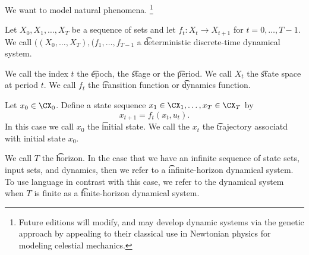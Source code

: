 

We want to model natural phenomena. \footnote{Future editions will modify, and may develop dynamic systems via the genetic approach by appealing to their classical use in Newtonian physics for modeling celestial mechanics.}


Let $X_0, X_1, \dots, X_T$ be a sequence of sets and let $f_t: X_t \to X_{t+1}$ for $t = 0, \dots, T-1$.
We call $((X_0, \dots, X_T), (f_1, \dots, f_{T-1}$ a \t{deterministic discrete-time dynamical system}.

We call the index $t$ the \t{epoch}, the \t{stage} or the \t{period}.
We call $X_t$ the \t{state space} at period $t$.
We call $f_t$ the \t{transition function} or \t{dynamics function}.

Let $x_0 \in \CX_0$.  Define a state sequence $x_1 \in \CX_1, \dots, x_T \in \CX_T$ by
\[
    x_{t+1} = f_t(x_t, u_t).
\]
In this case we call $x_0$ the \t{initial state}.
We call the $x_t$ the \t{trajectory} associatd with initial state $x_0$.

We call $T$ the \t{horizon}.
In the case that we have an infinite sequence of state sets, input sets, and dynamics, then we refer to a \t{infinite-horizon} dynamical system.
To use language in contrast with this case, we refer to the dynamical system when $T$ is finite as a \t{finite-horizon} dynamical system.

\blankpage
